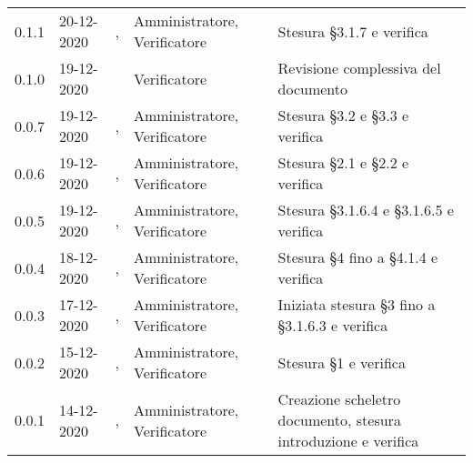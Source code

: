 {\begin{longtable}{C{1.7cm} | C{2.2cm} | C{3.2cm} | C{3cm} | C{4.8cm}}
0.1.1 & 20-12-2020 & \PA{}, \SP{}  & Amministratore, Verificatore & Stesura \S 3.1.7 e verifica \\
0.1.0 & 19-12-2020 & \SG{} & Verificatore & Revisione complessiva del documento \\
0.0.7 & 19-12-2020 & \RA{}, \SP{} & Amministratore, Verificatore & Stesura \S 3.2 e \S 3.3 e verifica \\
0.0.6 & 19-12-2020 & \ZM{}, \BM{} & Amministratore, Verificatore & Stesura \S 2.1 e \S 2.2 e verifica \\
0.0.5 & 19-12-2020 & \PA{}, \SP{} & Amministratore, Verificatore & Stesura \S 3.1.6.4 e \S 3.1.6.5 e verifica \\
0.0.4 & 18-12-2020 & \SH{}, \SP{} & Amministratore, Verificatore & Stesura \S 4 fino a \S 4.1.4 e verifica\\
0.0.3 & 17-12-2020 & \PA{}, \BM{} & Amministratore, Verificatore & Iniziata stesura \S 3 fino a \S 3.1.6.3 e verifica\\
0.0.2 & 15-12-2020 & \PA{}, \SP{} & Amministratore, Verificatore & Stesura \S 1 e verifica\\
0.0.1 & 14-12-2020 & \ZM{}, \SP{} & Amministratore, Verificatore & Creazione scheletro documento, stesura introduzione e verifica\\
		
\end{longtable}
}
